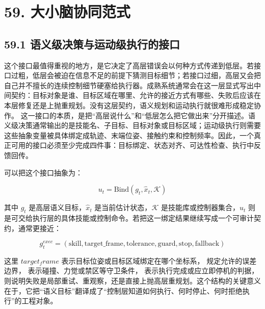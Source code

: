 \section*{59. 大小脑协同范式}

\subsection*{59.1 语义级决策与运动级执行的接口}


这个接口最值得重视的地方，是它决定了高层错误会以何种方式传递到低层。若接口过粗，低层会被迫在信息不足的前提下猜测目标细节；若接口过细，高层又会把自己并不擅长的连续控制细节硬塞给执行器。成熟系统通常会在这一层显式写出中间契约：目标对象是谁、目标区域在哪里、允许的接近方式有哪些、失败后应该在本层修复还是上抛重规划。没有这层契约，语义规划和运动执行就很难形成稳定协作。 这一接口的本质，是把“高层说什么”和“低层怎么把它做出来”分开描述。语义级决策通常输出的是技能名、子目标、目标对象或目标区域；运动级执行则需要这些抽象变量被具体绑定成轨迹、末端位姿、接触约束和控制频率。因此，一个真正可用的接口必须至少完成四件事：目标绑定、状态对齐、可达性检查、执行中反馈回传。

可以把这个接口抽象为：

\begin{equation*}
u_t = \mathrm{Bind}(g_t, \hat{x}_t, \mathcal{K})
\end{equation*}

其中 \(g_t\) 是高层语义目标，\(\hat{x}_t\) 是当前估计状态，\(\mathcal{K}\) 是技能库或控制器集合，\(u_t\) 则是可交给执行层的具体技能或控制命令。若把这一绑定结果继续写成一个可审计契约，通常更接近：

\begingroup
\scriptsize
\begin{equation*}
g_t^{exec} =
(\text{skill}, \text{target\_frame}, \text{tolerance}, \text{guard}, \text{stop}, \text{fallback})
\end{equation*}
\endgroup

这里 \(target_frame\) 表示目标位姿或目标区域绑定在哪个坐标系，\texttt{} 规定允许的误差边界，\texttt{} 表示碰撞、力觉或禁区等守卫条件，\texttt{} 表示执行完成或应立即停机的判据，\texttt{} 则说明失败是局部重试、重观察，还是直接上抛高层重规划。这个结构的关键意义在于，它把“语义目标”翻译成了“控制层知道如何执行、何时停止、何时拒绝执行”的工程对象。

